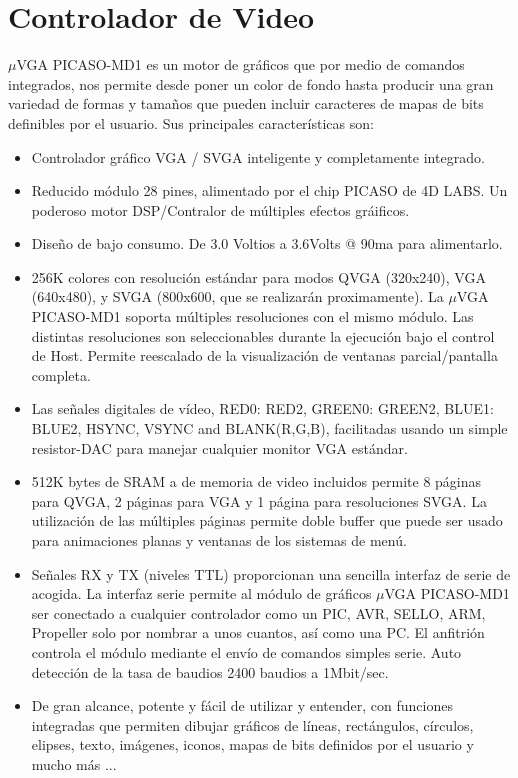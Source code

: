 \section{Controlador de Video}
$\mu$VGA PICASO-MD1 es un motor de gr\'aficos que por medio de comandos integrados, nos permite desde poner un color de fondo hasta producir una gran variedad de formas y tama\~nos que pueden incluir caracteres de mapas de bits definibles por el usuario. Sus principales caracter\'isticas son:\medskip

\begin{itemize}
\item Controlador gr\'afico VGA / SVGA inteligente y completamente integrado.

\item Reducido m\'odulo 28 pines, alimentado por el chip PICASO de 4D LABS. Un poderoso motor DSP/Contralor de m\'ultiples efectos gr\'aificos.

\item Dise\~no de bajo consumo. De 3.0 Voltios a 3.6Volts @ 90ma para alimentarlo.

\item 256K colores con resoluci\'on est\'andar para modos QVGA (320x240), VGA (640x480), y SVGA (800x600, que se realizar\'an proximamente). La $\mu$VGA PICASO-MD1 soporta m\'ultiples resoluciones con el mismo m\'odulo. Las distintas resoluciones son seleccionables durante la ejecuci\'on bajo el control de Host. Permite reescalado de la visualización de ventanas parcial/pantalla completa.

\item Las se\~nales digitales de v\'ideo, RED0: RED2, GREEN0: GREEN2, BLUE1: BLUE2, HSYNC, VSYNC and BLANK(R,G,B), facilitadas usando un simple resistor-DAC para manejar cualquier monitor VGA estándar.

\item 512K bytes de SRAM a de memoria de video incluidos permite 8 p\'aginas para QVGA, 2 p\'aginas para VGA y 1 p\'agina para resoluciones SVGA. La utilizaci\'on de las m\'ultiples p\'aginas permite doble buffer que puede ser usado para animaciones planas y ventanas de los sistemas de men\'u.

\item Se\~nales RX y TX (niveles TTL) proporcionan una sencilla interfaz de serie de acogida. La interfaz serie permite al m\'odulo de gr\'aficos $\mu$VGA PICASO-MD1 ser conectado a cualquier controlador como un PIC, AVR, SELLO, ARM, Propeller solo por nombrar a unos cuantos, as\'i como una PC. El anfitri\'on controla el m\'odulo mediante el env\'io de comandos simples serie. Auto detecci\'on de la tasa de baudios 2400 baudios a 1Mbit/sec.

\item De gran alcance, potente y f\'acil de utilizar y entender, con funciones integradas que permiten dibujar gr\'aficos de l\'ineas, rect\'angulos, c\'irculos, elipses, texto, im\'agenes, iconos, mapas de bits definidos por el usuario y mucho m\'as ...
\end{itemize}

